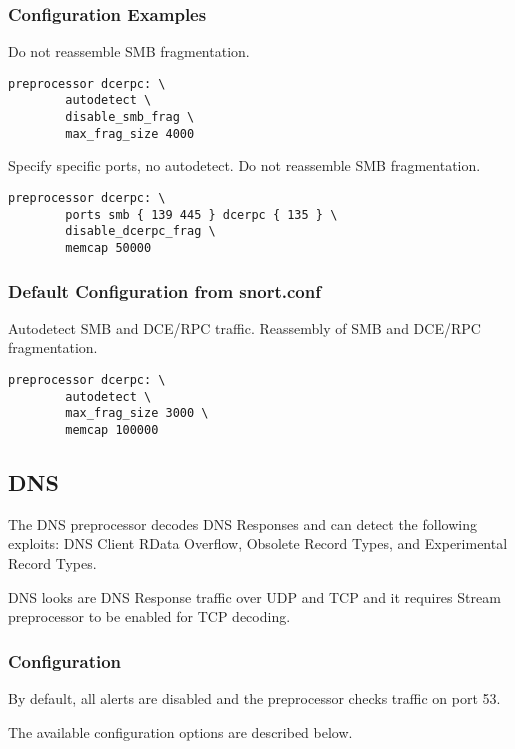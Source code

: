 \documentclass[english]{report}
\begin{document}
\subsubsection{Configuration Examples}

Do not reassemble SMB fragmentation.

\begin{verbatim}
preprocessor dcerpc: \
        autodetect \
        disable_smb_frag \
        max_frag_size 4000
\end{verbatim}

Specify specific ports, no autodetect.  Do not reassemble SMB fragmentation.

\begin{verbatim}
preprocessor dcerpc: \
        ports smb { 139 445 } dcerpc { 135 } \
        disable_dcerpc_frag \
        memcap 50000
\end{verbatim}

\subsubsection{Default Configuration from snort.conf}

Autodetect SMB and DCE/RPC traffic.  Reassembly of SMB and DCE/RPC
fragmentation.

\begin{verbatim}
preprocessor dcerpc: \
        autodetect \
        max_frag_size 3000 \
        memcap 100000
\end{verbatim}

\subsection{DNS\label{sub:dns}}

The DNS preprocessor decodes DNS Responses and can detect the
following exploits: DNS Client RData Overflow, Obsolete Record
Types, and Experimental Record Types.

DNS looks are DNS Response traffic over UDP and TCP and it requires
Stream preprocessor to be enabled for TCP decoding.

\subsubsection{Configuration}

By default, all alerts are disabled and the preprocessor checks traffic
on port 53.

The available configuration options are described below.
\end{document}
